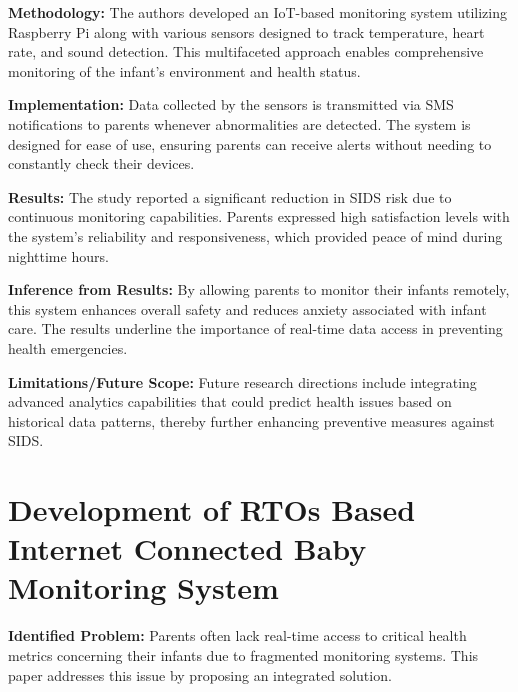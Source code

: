 \documentclass[12pt,a4paper]{report}
\begin{document}
\setlength{\parskip}{1em}  %


\noindent\textbf{Methodology:} The authors developed an IoT-based monitoring system utilizing Raspberry Pi along with various sensors designed to track temperature, heart rate, and sound detection. This multifaceted approach enables comprehensive monitoring of the infant's environment and health status.

\setlength{\parskip}{1em}  %


\noindent\textbf{Implementation:} Data collected by the sensors is transmitted via SMS notifications to parents whenever abnormalities are detected. The system is designed for ease of use, ensuring parents can receive alerts without needing to constantly check their devices.
\setlength{\parskip}{1em}  %

\noindent\textbf{Results:} The study reported a significant reduction in SIDS risk due to continuous monitoring capabilities. Parents expressed high satisfaction levels with the system's reliability and responsiveness, which provided peace of mind during nighttime hours.

\setlength{\parskip}{1em}  %


\noindent\textbf{Inference from Results:} By allowing parents to monitor their infants remotely, this system enhances overall safety and reduces anxiety associated with infant care. The results underline the importance of real-time data access in preventing health emergencies.


\setlength{\parskip}{1em}  %

\noindent\textbf{Limitations/Future Scope:} Future research directions include integrating advanced analytics capabilities that could predict health issues based on historical data patterns, thereby further enhancing preventive measures against SIDS.
\setlength{\parskip}{1em}  %


\section{Development of RTOs Based Internet Connected Baby Monitoring System}
\textbf{Identified Problem:} Parents often lack real-time access to critical health metrics concerning their infants due to fragmented monitoring systems. This paper addresses this issue by proposing an integrated solution\cite{mishra2018development}.
\end{document}
